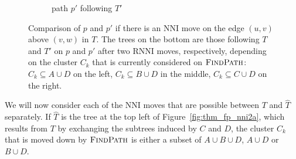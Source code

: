 \documentclass{amsart}
\newcommand{\rnni}{\mathrm{RNNI}}
\newcommand{\findpath}{\textsc{FindPath}}
\newcommand{\nni}{\mathrm{NNI}}
\begin{document}
\begin{enumerate}
\begin{figure}[H]
\begin{subfigure}[b]{.45\textwidth}
		\vspace{12pt}
		\caption{path $p'$ following $T'$}
		\label{fig:thm_fp_nni2b}
	\end{subfigure}
	\caption{Comparison of $p$ and $p'$ if there is an $\nni$ move on the edge $(u,v)$ above $(v,w)$ in $T$.
	The trees on the bottom are those following $T$ and $T'$ on $p$ and $p'$ after two $\rnni$ moves, respectively, depending on the cluster $C_k$ that is currently considered on $\findpath$:
	${C_k \subseteq A \cup D}$ on the left, ${C_k \subseteq B \cup D}$ in the middle, ${C_k \subseteq C \cup D}$ on the right.}
\end{figure}

We will now consider each of the $\nni$ moves that are possible between $T$ and $\hat T$ separately.
If $\hat T$ is the tree at the top left of Figure~\ref{fig:thm_fp_nni2a}, which results from $T$ by exchanging the subtrees induced by $C$ and $D$, the cluster $C_k$ that is moved down by $\findpath$ is either a subset of $A \cup B \cup D$, $A \cup D$ or $B \cup D$.


\end{enumerate}
\end{document}
